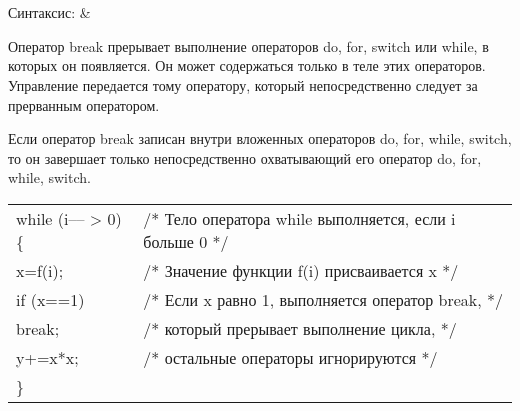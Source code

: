 
\section{}

\begin{pHeader}
Синтаксис:      & \\
\end{pHeader}

Оператор break прерывает выполнение операторов do, for, switch или while, в которых он появляется. Он может содержаться только в теле этих операторов. Управление передается тому оператору, который непосредственно следует за прерванным оператором. \killoverfullbefore

Если оператор break записан внутри вложенных операторов do, for, while, switch, то он завершает только непосредственно охватывающий его оператор do, for, while, switch. \killoverfullbefore \BL

\begin{pExample}
\begin{tabular}{ l l }
 while (i{--}{--} > 0) \{ & \textcolor{exComm}{/* Тело оператора while выполняется, если i больше 0 */} \\
\indent x=f(i);  & \textcolor{exComm}{/* Значение функции f(i) присваивается x */} \\
\indent if (x==1) & \textcolor{exComm}{/* Если x равно 1, выполняется оператор break,    */} \\
\indent \indent break; & \textcolor{exComm}{/* который прерывает выполнение цикла, */} \\
\indent y+=x*x; & \textcolor{exComm}{/* остальные операторы игнорируются */} \\
\} & \textcolor{exComm}{} \\
\end{tabular}
\end{pExample}

\section{}

